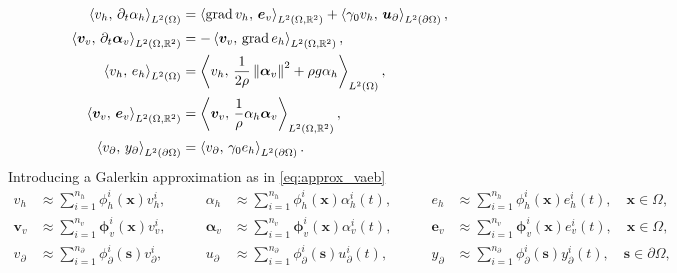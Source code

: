 \begin{equation}\label{eq:weak_sys_shwater_grad}
\begin{aligned}
\inner[L^2(\Omega)]{{v}_h}{\partial_t {\alpha}_h} &=  \inner[L^2(\Omega, \mathbb{R}^2)]{\grad {v}_h}{\bm{e}_v} + \inner[L^2(\partial\Omega)]{\gamma_{0} {v}_h}{\bm{u}_\partial}, \\
\inner[L^2(\Omega, \mathbb{R}^2)]{\bm{v}_v}{\partial_t \bm{\alpha}_v} &=   -\inner[L^2(\Omega, \mathbb{R}^2)]{\bm{v}_v}{\grad e_h}, \\
\inner[L^2(\Omega)]{{v}_h}{{e}_h}&= \inner[L^2(\Omega)]{v_h}{\frac{1}{2 \rho} \norm{\bm{\alpha}_v}^2 + \rho g \alpha_h}, \\
\inner[L^2(\Omega, \mathbb{R}^2)]{\bm{v}_v}{\bm{e}_v}&= \inner[L^2(\Omega, \mathbb{R}^2)]{\bm{v}_v}{\frac{1}{\rho} \alpha_h \bm{\alpha}_v}, \\
\inner[L^2(\partial\Omega)]{{v}_\partial}{{y}_\partial} &= \inner[L^2(\partial\Omega)]{{v}_\partial}{\gamma_0 {e}_h}.
\end{aligned}
\end{equation}
Introducing a Galerkin approximation as in \eqref{eq:approx_vaeb}
\begin{equation}\label{eq:approxSW_vaeb}
\begin{aligned}
{v}_h &\approx \sum_{i=1}^{n_h} {\phi}_h^i(\bm{x}) v_h^i, \\
\bm{v}_v &\approx \sum_{i=1}^{n_v} \bm{\phi}_v^i(\bm{x}) v_v^i, \\
{v}_\partial &\approx \sum_{i=1}^{n_\partial} {\phi}_\partial^i(\bm{s}) v_\partial^i,
\end{aligned} \qquad 
\begin{aligned}
{\alpha}_h &\approx \sum_{i=1}^{n_h} {\phi}_h^i(\bm{x}) \alpha_h^i(t), \\
\bm{\alpha}_v &\approx \sum_{i=1}^{n_v} \bm{\phi}_v^i(\bm{x}) \alpha_v^i(t), \\
{u}_\partial &\approx \sum_{i=1}^{n_\partial} {\phi}_\partial^i(\bm{s}) u_\partial^i(t), 
\end{aligned} \qquad 
\begin{aligned}
{e}_h &\approx \sum_{i=1}^{n_h} {\phi}_h^i(\bm{x}) e_h^i(t), \quad \bm{x} \in \Omega, \\
\bm{e}_v &\approx \sum_{i=1}^{n_v} \bm{\phi}_v^i(\bm{x}) e_v^i(t), \quad \bm{x} \in \Omega,\\
{y}_\partial &\approx \sum_{i=1}^{n_\partial} {\phi}_\partial^i(\bm{s}) y_\partial^i(t), \quad \bm{s} \in \partial\Omega,
\end{aligned}
\end{equation}
